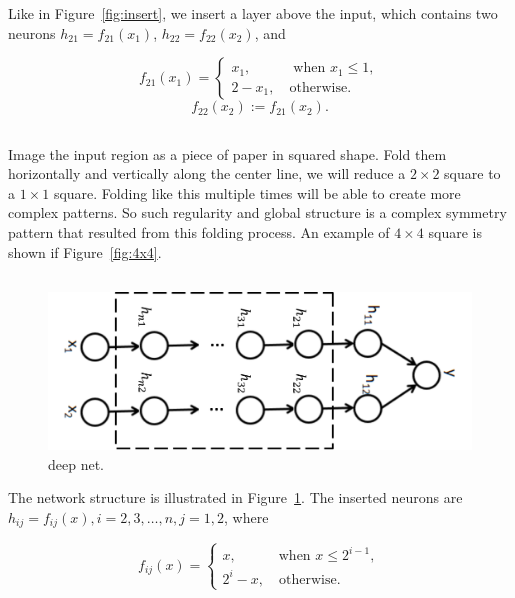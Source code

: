 Like in Figure~\ref{fig:insert},
we insert a layer above the input,
which contains two neurons
$h_{21}=f_{21}(x_1)$,
$h_{22}=f_{22}(x_2)$, and

\begin{equation}
    f_{21}(x_1) = \begin{cases}
            x_1, \quad\quad\quad \text{when }x_1\le 1, \\
            2-x_1, \quad \text{otherwise}.
        \end{cases}
\end{equation}
\begin{equation}
    f_{22}(x_2) := f_{21}(x_2).
\end{equation}

\subsection{} %

Image the input region as a piece of paper in squared shape.
Fold them horizontally and vertically along the center line,
we will reduce a $2\times 2$ square to a $1\times 1$ square.
Folding like this multiple times will be able to create more
complex patterns.
So such regularity and global structure is a complex symmetry pattern
that resulted from this folding process.
An example of $4\times 4$ square is shown if Figure~\ref{fig:4x4}.

\subsection{} %

\begin{figure}[ht]
\centering
    \includegraphics[width=0.6\linewidth]{fig/more.png}
    \caption{\small
    deep net.}
    \label{fig:more}
\end{figure}

The network structure is illustrated in Figure~\ref{fig:more}.
The inserted neurons are $h_{ij}=f_{ij}(x), i=2,3,\dots,n, j=1,2$,
where

\begin{equation}
    f_{ij}(x) = \begin{cases}
            x, \quad\quad\quad \text{when }x\le 2^{i-1}, \\
            2^i-x, \quad \text{otherwise}.
        \end{cases}
\end{equation}

\subsection{} %
